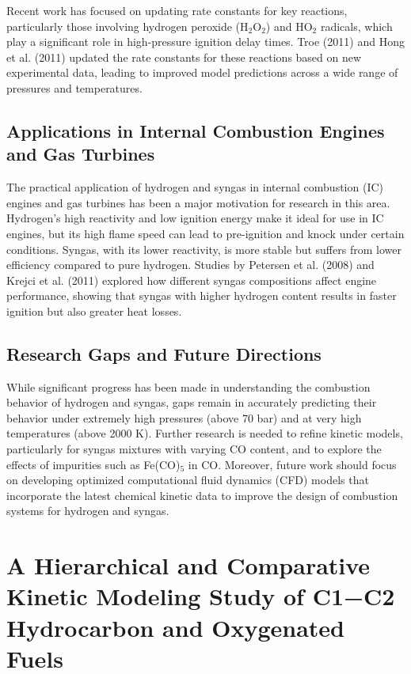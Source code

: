 \documentclass[12pt]{report}
\begin{document}
Recent work has focused on updating rate constants for key reactions, particularly those involving hydrogen peroxide (H$_2$O$_2$) and HO$_2$ radicals, which play a significant role in high-pressure ignition delay times. Troe (2011) and Hong et al. (2011) updated the rate constants for these reactions based on new experimental data, leading to improved model predictions across a wide range of pressures and temperatures.

\subsection{Applications in Internal Combustion Engines and Gas Turbines}
The practical application of hydrogen and syngas in internal combustion (IC) engines and gas turbines has been a major motivation for research in this area. Hydrogen’s high reactivity and low ignition energy make it ideal for use in IC engines, but its high flame speed can lead to pre-ignition and knock under certain conditions. Syngas, with its lower reactivity, is more stable but suffers from lower efficiency compared to pure hydrogen. Studies by Petersen et al. (2008) and Krejci et al. (2011) explored how different syngas compositions affect engine performance, showing that syngas with higher hydrogen content results in faster ignition but also greater heat losses.

\subsection{Research Gaps and Future Directions}
While significant progress has been made in understanding the combustion behavior of hydrogen and syngas, gaps remain in accurately predicting their behavior under extremely high pressures (above 70 bar) and at very high temperatures (above 2000 K). Further research is needed to refine kinetic models, particularly for syngas mixtures with varying CO content, and to explore the effects of impurities such as Fe(CO)$_5$ in CO. Moreover, future work should focus on developing optimized computational fluid dynamics (CFD) models that incorporate the latest chemical kinetic data to improve the design of combustion systems for hydrogen and syngas.

\section{A Hierarchical and Comparative Kinetic Modeling Study of C1−C2 Hydrocarbon and Oxygenated Fuels}
\end{document}
